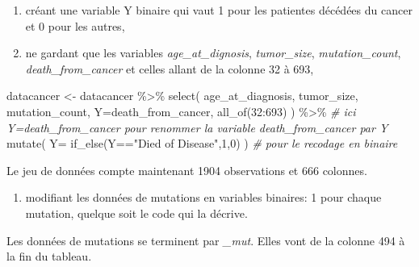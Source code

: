 \documentclass[
  12pt,
]{article}
\newenvironment{Shaded}{\begin{snugshade}}{\end{snugshade}}
\newcommand{\AttributeTok}[1]{\textcolor[rgb]{0.77,0.63,0.00}{#1}}
\newcommand{\CommentTok}[1]{\textcolor[rgb]{0.56,0.35,0.01}{\textit{#1}}}
\newcommand{\DecValTok}[1]{\textcolor[rgb]{0.00,0.00,0.81}{#1}}
\newcommand{\FunctionTok}[1]{\textcolor[rgb]{0.00,0.00,0.00}{#1}}
\newcommand{\NormalTok}[1]{#1}
\newcommand{\OtherTok}[1]{\textcolor[rgb]{0.56,0.35,0.01}{#1}}
\newcommand{\SpecialCharTok}[1]{\textcolor[rgb]{0.00,0.00,0.00}{#1}}
\newcommand{\StringTok}[1]{\textcolor[rgb]{0.31,0.60,0.02}{#1}}
\providecommand{\tightlist}{%
  \setlength{\itemsep}{0pt}\setlength{\parskip}{0pt}}
\begin{document}
\begin{enumerate}
\def\labelenumi{\alph{enumi}.}
\tightlist
\item
  créant une variable Y binaire qui vaut 1 pour les patientes décédées
  du cancer et 0 pour les autres,
\item
  ne gardant que les variables \emph{age\_at\_dignosis},
  \emph{tumor\_size}, \emph{mutation\_count}, \emph{death\_from\_cancer}
  et celles allant de la colonne 32 à 693,
\end{enumerate}

\begin{Shaded}
\begin{Highlighting}[]
\NormalTok{ datacancer }\OtherTok{\textless{}{-}}\NormalTok{ datacancer }\SpecialCharTok{\%\textgreater{}\%} 
   \FunctionTok{select}\NormalTok{( age\_at\_diagnosis, }
\NormalTok{           tumor\_size, mutation\_count,}
           \AttributeTok{Y=}\NormalTok{death\_from\_cancer, }
           \FunctionTok{all\_of}\NormalTok{(}\DecValTok{32}\SpecialCharTok{:}\DecValTok{693}\NormalTok{)}
\NormalTok{           ) }\SpecialCharTok{\%\textgreater{}\%}  \CommentTok{\# ici Y=death\_from\_cancer pour renommer la variable death\_from\_cancer par Y}
   \FunctionTok{mutate}\NormalTok{( }\AttributeTok{Y=} \FunctionTok{if\_else}\NormalTok{(Y}\SpecialCharTok{==}\StringTok{"Died of Disease"}\NormalTok{,}\DecValTok{1}\NormalTok{,}\DecValTok{0}\NormalTok{) ) }\CommentTok{\# pour le recodage en binaire}
\end{Highlighting}
\end{Shaded}

Le jeu de données compte maintenant 1904 observations et 666 colonnes.

\begin{enumerate}
\def\labelenumi{\alph{enumi}.}
\setcounter{enumi}{2}
\tightlist
\item
  modifiant les données de mutations en variables binaires: 1 pour
  chaque mutation, quelque soit le code qui la décrive.
\end{enumerate}

Les données de mutations se terminent par \emph{\_mut}. Elles vont de la
colonne 494 à la fin du tableau.
\end{document}
